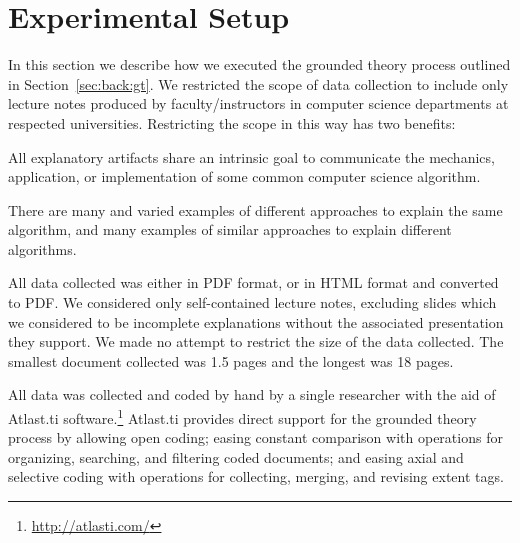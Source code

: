 \documentclass[sigconf]{acmart}
\begin{document}
%


\section{Experimental Setup}
\label{sec:exp:setup}

In this section we describe how we executed the grounded theory process
outlined in Section~\ref{sec:back:gt}.
%
We restricted the scope of data collection to include only lecture notes
produced by faculty/instructors in computer science departments at respected
universities. Restricting the scope in this way has two benefits:
%
\begin{enumerate*}
%
\item All explanatory artifacts share an intrinsic goal to communicate the
mechanics, application, or implementation of some common computer science
algorithm.
%
\item There are many and varied examples of different approaches to explain the
same algorithm, and many examples of similar approaches to explain different
algorithms.
%
\end{enumerate*}
%
All data collected was either in PDF format, or in HTML format and converted to
PDF. We considered only self-contained lecture notes, excluding slides which we
considered to be incomplete explanations without the associated presentation
they support.
%
We made no attempt to restrict the size of the data collected. The smallest
document collected was 1.5 pages and the longest was 18 pages.


All data was collected and coded by hand by a single researcher with the aid of
Atlast.ti software.\footnote{\url{http://atlasti.com/}}
%
Atlast.ti provides direct support for the grounded theory process by allowing
open coding; easing constant comparison with operations for organizing,
searching, and filtering coded documents; and easing axial and selective coding
with operations for collecting, merging, and revising extent tags.
\end{document}
